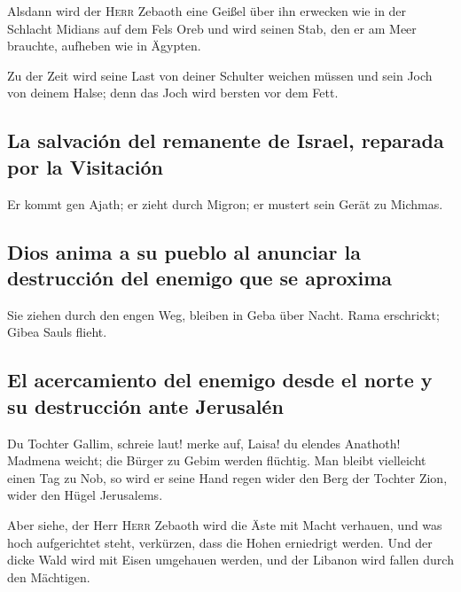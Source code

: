  Alsdann wird der \textsc{Herr} Zebaoth eine Geißel über
ihn erwecken wie in der Schlacht Midians auf dem Fels Oreb und wird
seinen Stab, den er am Meer brauchte, aufheben wie in Ägypten.

 Zu der Zeit wird seine Last von deiner Schulter weichen
müssen und sein Joch von deinem Halse; denn das Joch wird bersten vor
dem Fett.

\hypertarget{la-salvaciuxf3n-del-remanente-de-israel-reparada-por-la-visitaciuxf3n}{%
\subsection{La salvación del remanente de Israel, reparada por la
Visitación}\label{la-salvaciuxf3n-del-remanente-de-israel-reparada-por-la-visitaciuxf3n}}

 Er kommt gen Ajath; er zieht durch Migron; er mustert
sein Gerät zu Michmas.

\hypertarget{dios-anima-a-su-pueblo-al-anunciar-la-destrucciuxf3n-del-enemigo-que-se-aproxima}{%
\subsection{Dios anima a su pueblo al anunciar la destrucción del
enemigo que se
aproxima}\label{dios-anima-a-su-pueblo-al-anunciar-la-destrucciuxf3n-del-enemigo-que-se-aproxima}}

 Sie ziehen durch den engen Weg, bleiben in Geba über
Nacht. Rama erschrickt; Gibea Sauls flieht.

\hypertarget{el-acercamiento-del-enemigo-desde-el-norte-y-su-destrucciuxf3n-ante-jerusaluxe9n}{%
\subsection{El acercamiento del enemigo desde el norte y su destrucción
ante
Jerusalén}\label{el-acercamiento-del-enemigo-desde-el-norte-y-su-destrucciuxf3n-ante-jerusaluxe9n}}

 Du Tochter Gallim, schreie laut! merke auf, Laisa! du
elendes Anathoth!  Madmena weicht; die Bürger zu Gebim
werden flüchtig.  Man bleibt vielleicht einen Tag zu Nob,
so wird er seine Hand regen wider den Berg der Tochter Zion, wider den
Hügel Jerusalems.

 Aber siehe, der Herr \textsc{Herr} Zebaoth wird die Äste
mit Macht verhauen, und was hoch aufgerichtet steht, verkürzen, dass die
Hohen erniedrigt werden.  Und der dicke Wald wird mit
Eisen umgehauen werden, und der Libanon wird fallen durch den Mächtigen.

